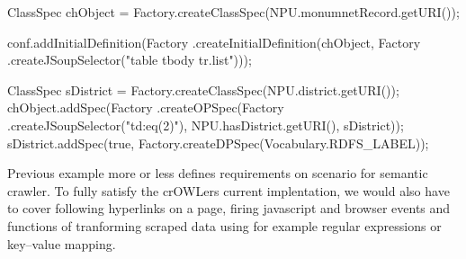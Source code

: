 \begtt
ClassSpec chObject = Factory.createClassSpec(NPU.monumnetRecord.getURI());

conf.addInitialDefinition(Factory
      .createInitialDefinition(chObject, Factory
        .createJSoupSelector("table tbody tr.list")));

ClassSpec sDistrict = Factory.createClassSpec(NPU.district.getURI());
chObject.addSpec(Factory
          .createOPSpec(Factory
            .createJSoupSelector("td:eq(2)"), NPU.hasDistrict.getURI(), sDistrict));
sDistrict.addSpec(true, Factory.createDPSpec(Vocabulary.RDFS_LABEL));
\endtt

Previous example more or less defines requirements on scenario for semantic
crawler. To fully satisfy the crOWLers current implentation, we would also have
to cover following hyperlinks on a page, firing javascript and browser events and
functions of tranforming scraped data using for example regular expressions or
key--value mapping. 

%


%
%
%
%





